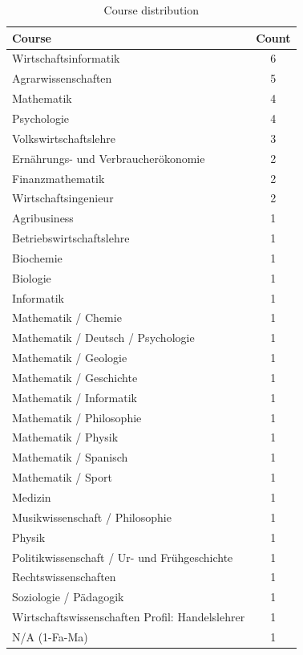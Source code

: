 \documentclass{sig-alternate-05-2015}
\begin{document}
\begin{table}[!h]
	\centering
	\caption{Course distribution}
	\label{tab:course}
	\begin{tabular}{@{}p{14cm}|c}
		\toprule
		\textbf{Course} & \textbf{Count} \\
		\midrule Wirtschaftsinformatik & 6 \\
		\midrule Agrarwissenschaften & 5 \\
		\midrule Mathematik & 4 \\
		\midrule Psychologie & 4 \\
		\midrule Volkswirtschaftslehre & 3 \\
		\midrule Ernährungs- und Verbraucherökonomie & 2 \\
		\midrule Finanzmathematik & 2 \\
		\midrule Wirtschaftsingenieur & 2 \\
		\midrule Agribusiness & 1 \\
		\midrule Betriebswirtschaftslehre & 1 \\
		\midrule Biochemie & 1 \\
		\midrule Biologie & 1 \\
		\midrule Informatik & 1 \\
		
		\midrule Mathematik / Chemie & 1 \\
		\midrule Mathematik / Deutsch / Psychologie & 1 \\
		\midrule Mathematik / Geologie & 1 \\
		\midrule Mathematik / Geschichte & 1 \\
		\midrule Mathematik / Informatik & 1 \\
		\midrule Mathematik / Philosophie & 1 \\
		\midrule Mathematik / Physik & 1 \\
		\midrule Mathematik / Spanisch & 1 \\
		\midrule Mathematik / Sport & 1 \\
		
		\midrule Medizin & 1 \\
		\midrule Musikwissenschaft / Philosophie & 1 \\
		\midrule Physik & 1 \\
		\midrule Politikwissenschaft / Ur- und Frühgeschichte & 1 \\
		\midrule Rechtswissenschaften & 1 \\
		\midrule Soziologie / Pädagogik & 1 \\
		\midrule Wirtschaftswissenschaften Profil: Handelslehrer & 1 \\
		\midrule N/A (1-Fa-Ma) & 1 \\
	\end{tabular}
\end{table}
\end{document}
